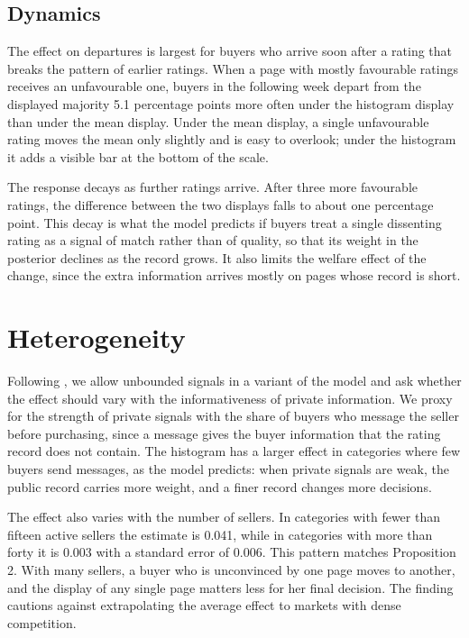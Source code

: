 \documentclass[12pt]{article}
\begin{document}
\subsection{Dynamics}
The effect on departures is largest for buyers who arrive soon after a rating that breaks the pattern of earlier ratings. When a page with mostly favourable ratings receives an unfavourable one, buyers in the following week depart from the displayed majority 5.1 percentage points more often under the histogram display than under the mean display. Under the mean display, a single unfavourable rating moves the mean only slightly and is easy to overlook; under the histogram it adds a visible bar at the bottom of the scale.

The response decays as further ratings arrive. After three more favourable ratings, the difference between the two displays falls to about one percentage point. This decay is what the model predicts if buyers treat a single dissenting rating as a signal of match rather than of quality, so that its weight in the posterior declines as the record grows. It also limits the welfare effect of the change, since the extra information arrives mostly on pages whose record is short.

\section{Heterogeneity}
Following \citet{smith2000}, we allow unbounded signals in a variant of the model and ask whether the effect should vary with the informativeness of private information. We proxy for the strength of private signals with the share of buyers who message the seller before purchasing, since a message gives the buyer information that the rating record does not contain. The histogram has a larger effect in categories where few buyers send messages, as the model predicts: when private signals are weak, the public record carries more weight, and a finer record changes more decisions.

The effect also varies with the number of sellers. In categories with fewer than fifteen active sellers the estimate is 0.041, while in categories with more than forty it is 0.003 with a standard error of 0.006. This pattern matches Proposition 2. With many sellers, a buyer who is unconvinced by one page moves to another, and the display of any single page matters less for her final decision. The finding cautions against extrapolating the average effect to markets with dense competition.
\end{document}
